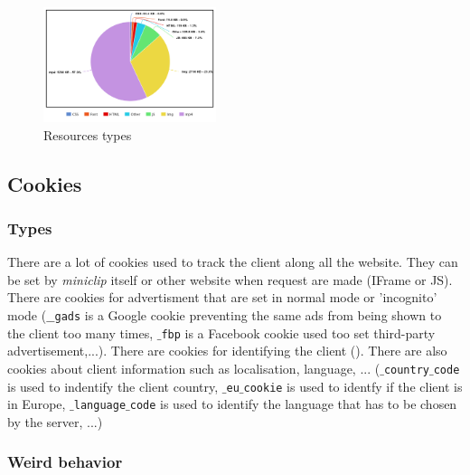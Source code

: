 \documentclass{article}
\begin{document}
\begin{figure}[h]
    \centering
    \includegraphics[width=0.45\textwidth]{res/imgs/resources.png}
    \caption{Resources types}
    \label{fig:res}
\end{figure}

\subsection{Cookies}
\label{sub:cookies}

\subsubsection{Types}

There are a lot of cookies used to track the client along all the website. They can be set by \textit{miniclip} itself or other website when request are made (IFrame or JS). There are cookies for advertisment that are set in normal mode or 'incognito' mode (\texttt{$\_\_$gads} is a Google cookie preventing the same ads from being shown to the client too many times, \texttt{$\_$fbp} is a Facebook cookie used too set third-party advertisement,...). There are cookies for identifying the client (). There are also cookies about client information such as localisation, language, ... (\texttt{$\_$country$\_$code} is used to indentify the client country, \texttt{$\_$eu$\_$cookie} is used to identfy if the client is in Europe, \texttt{$\_$language$\_$code} is used to identify the language that has to be chosen by the server, ...)

\subsubsection{Weird behavior}
\end{document}
